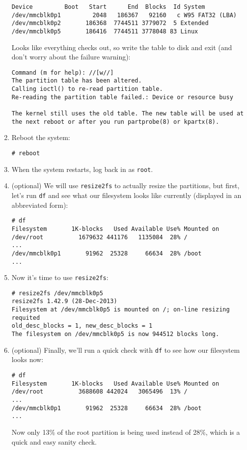 \documentclass[12pt,letterpaper]{article}
\begin{document}
\begin{enumerate}
\begin{lstlisting}[basicstyle=\ttfamily\footnotesize]
Device         Boot   Start      End  Blocks  Id System
/dev/mmcblk0p1         2048   186367   92160   c W95 FAT32 (LBA)
/dev/mmcblk0p2       186368  7744511 3779072  5 Extended
/dev/mmcblk0p5       186416  7744511 3778048 83 Linux
\end{lstlisting}
Looks like everything checks out, so %
write the table to disk and exit (and don't worry about the failure warning):
\begin{lstlisting}
Command (m for help): //[w//]
The partition table has been altered.
Calling ioctl() to re-read partition table.
Re-reading the partition table failed.: Device or resource busy

The kernel still uses the old table. The new table will be used at the next reboot or after you run partprobe(8) or kpartx(8).
\end{lstlisting}

\item Reboot the system:
\begin{lstlisting}
# reboot
\end{lstlisting}

\item When the system restarts, log back in as \lstinline{root}.

\item (optional) We will use \lstinline{resize2fs} to actually resize the partitions, but first, let's run \lstinline{df} and see what our filesystem looks like currently (displayed in an abbreviated form):
\begin{lstlisting}[basicstyle=\ttfamily\scriptsize]
# df
Filesystem       1K-blocks   Used Available Use% Mounted on
/dev/root          1679632 441176   1135084  28% /
...
/dev/mmcblk0p1       91962  25328     66634  28% /boot
...
\end{lstlisting}

\item Now it's time to use \lstinline{resize2fs}:
\begin{lstlisting}
# resize2fs /dev/mmcblk0p5
resize2fs 1.42.9 (28-Dec-2013)
Filesystem at /dev/mmcblk0p5 is mounted on /; on-line resizing requited
old_desc_blocks = 1, new_desc_blocks = 1
The filesystem on /dev/mmcblk0p5 is now 944512 blocks long.
\end{lstlisting}

\item (optional) Finally, we'll run a quick check with \lstinline{df} to see how our filesystem looks now:
\begin{lstlisting}[basicstyle=\ttfamily\scriptsize]
# df
Filesystem       1K-blocks   Used Available Use% Mounted on
/dev/root          3688608 442024   3065496  13% /
...
/dev/mmcblk0p1       91962  25328     66634  28% /boot
...
\end{lstlisting}
Now only 13\% of the root partition is being used instead of 28\%, which is a quick and easy sanity check.
\end{enumerate}
\end{document}
